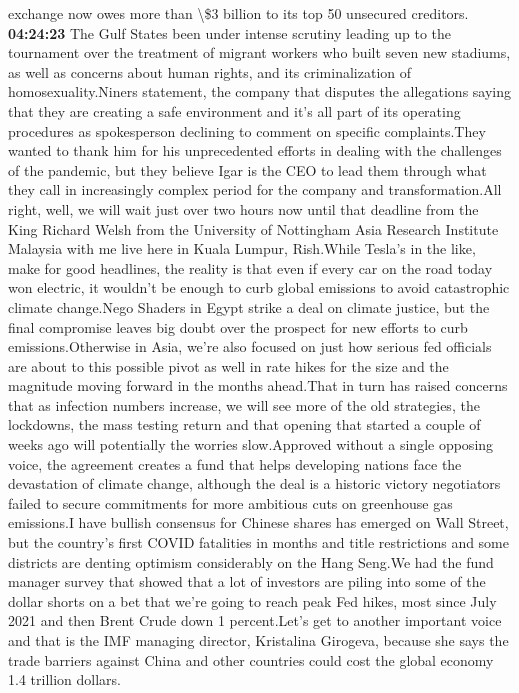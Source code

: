 \documentclass{article}%
\begin{document}
exchange now owes more than \textbackslash{}\$3 billion to its top 50 unsecured creditors.%
\textbf{04:24:23}%
\newline%
The Gulf States been under intense scrutiny leading up to the tournament over the treatment of migrant workers who built seven new stadiums, as well as concerns about human rights, and its criminalization of homosexuality.Niners statement, the company that disputes the allegations saying that they are creating a safe environment and it's all part of its operating procedures as spokesperson declining to comment on specific complaints.They wanted to thank him for his unprecedented efforts in dealing with the challenges of the pandemic, but they believe Igar is the CEO to lead them through what they call in increasingly complex period for the company and transformation.All right, well, we will wait just over two hours now until that deadline from the King Richard Welsh from the University of Nottingham Asia Research Institute Malaysia with me live here in Kuala Lumpur, Rish.While Tesla's in the like, make for good headlines, the reality is that even if every car on the road today won electric, it wouldn't be enough to curb global emissions to avoid catastrophic climate change.Nego Shaders in Egypt strike a deal on climate justice, but the final compromise leaves big doubt over the prospect for new efforts to curb emissions.Otherwise in Asia, we're also focused on just how serious fed officials are about to this possible pivot as well in rate hikes for the size and the magnitude moving forward in the months ahead.That in turn has raised concerns that as infection numbers increase, we will see more of the old strategies, the lockdowns, the mass testing return and that opening that started a couple of weeks ago will potentially the worries slow.Approved without a single opposing voice, the agreement creates a fund that helps developing nations face the devastation of climate change, although the deal is a historic victory negotiators failed to secure commitments for more ambitious cuts on greenhouse gas emissions.I have bullish consensus for Chinese shares has emerged on Wall Street, but the country's first COVID fatalities in months and title restrictions and some districts are denting optimism considerably on the Hang Seng.We had the fund manager survey that showed that a lot of investors are piling into some of the dollar shorts on a bet that we're going to reach peak Fed hikes, most since July 2021 and then Brent Crude down 1 percent.Let's get to another important voice and that is the IMF managing director, Kristalina Girogeva, because she says the trade barriers against China and other countries could cost the global economy 1.4 trillion dollars.%
\end{document}
